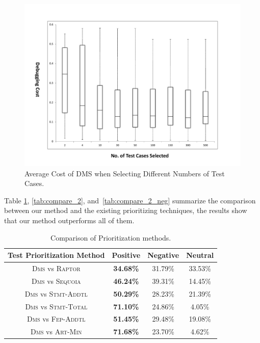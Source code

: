 \begin{figure}[!htbp]
    \centering
    \includegraphics[width=12cm]{mut-sdm.pdf}
    \caption{Average Cost of DMS when Selecting Different Numbers of Test Cases.}\label{fig:costmulti}

\end{figure}

\vspace{0.2cm}
 Table \ref{tab:compare_1}, \ref{tab:compare_2}, and~\ref{tab:compare_2_neg} summarize the comparison between our method and the existing prioritizing techniques, the results show that our method outperforms all of them.

\begin{table}[!htbp]
    \centering
		\caption{Comparison of Prioritization methods.}
		\renewcommand{\arraystretch}{1.5}
		\small
        \begin{tabular}{|c|c|c|c|}
			\hline
			Test Prioritization Method  &  Positive  &  Negative  &   Neutral  \\
			\hline\hline
			\textsc{Dms} vs \textsc{Raptor} & {\bf 34.68\%} &    31.79\% &    33.53\% \\
			\hline
			\textsc{Dms} vs \textsc{Sequoia} & {\bf 46.24\%} &    39.31\% &    14.45\% \\
			\hline
			\textsc{Dms} vs \textsc{Stmt-Addtl} & {\bf 50.29\%} &    28.23\% &    21.39\% \\
			\hline
			\textsc{Dms} vs \textsc{Stmt-Total} & {\bf 71.10\%} &    24.86\% &    4.05\% \\
			\hline
			\textsc{Dms} vs \textsc{Fep-Addtl} & {\bf 51.45\%} &   29.48\% &    19.08\% \\
			\hline
			\textsc{Dms} vs \textsc{Art-Min} & {\bf 71.68\%} &    23.70\% &    4.62\% \\
			\hline
		\end{tabular}
    \label{tab:compare_1}
\end{table}



